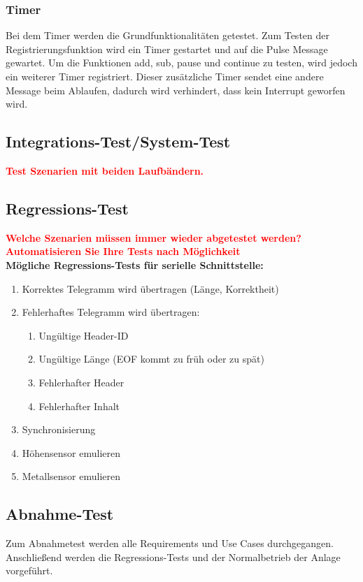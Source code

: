 \documentclass[oneside,a4paper,titlepage]{scrartcl} %
\begin{document}
\subsubsection{Timer}
Bei dem Timer werden die Grundfunktionalitäten getestet.
Zum Testen der Registrierungsfunktion wird ein Timer gestartet und auf die Pulse Message gewartet.
Um die Funktionen add, sub, pause und continue zu testen, wird jedoch ein weiterer Timer registriert.
Dieser zusätzliche Timer sendet eine andere Message beim Ablaufen, dadurch wird verhindert, dass kein Interrupt
geworfen wird.

\subsection{Integrations-Test/System-Test}
\textcolor{red}{\textbf{Test Szenarien mit beiden Laufbändern.}}

\subsection{Regressions-Test}
\textcolor{red}{\textbf{Welche Szenarien müssen immer wieder abgetestet werden? Automatisieren Sie Ihre Tests nach
Möglichkeit}}\\
\newline
\textbf{Mögliche Regressions-Tests für serielle Schnittstelle:}\\
\begin{enumerate}
 \item Korrektes Telegramm wird übertragen (Länge, Korrektheit)
 \item Fehlerhaftes Telegramm wird übertragen:
 \begin{enumerate}
  \item Ungültige Header-ID
  \item Ungültige Länge (EOF kommt zu früh oder zu spät)
  \item Fehlerhafter Header
  \item Fehlerhafter Inhalt
 \end{enumerate}
 \item Synchronisierung
 \item Höhensensor emulieren
 \item Metallsensor emulieren
\end{enumerate}

\subsection{Abnahme-Test}
Zum Abnahmetest werden alle Requirements und Use Cases durchgegangen. Anschließend werden
die Regressions-Tests und der Normalbetrieb der Anlage vorgeführt.
\end{document}
